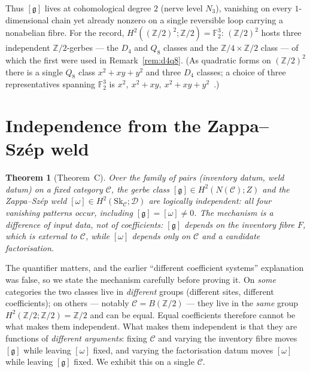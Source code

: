 \documentclass[11pt]{article}
\newtheorem{theorem}{Theorem}
\theoremstyle{definition}
\newcommand{\C}{\mathcal{C}}
\newcommand{\Sk}{\mathrm{Sk}}
\newcommand{\Z}{\mathbb{Z}}
\newcommand{\Zc}{Z}
\newcommand{\gerbe}{\mathfrak{g}}
\newcommand{\Dfr}{\mathcal{D}}
\begin{document}
Thus $[\gerbe]$ lives at cohomological degree $2$ (nerve level $N_3$), vanishing on every
$1$-dimensional chain yet already nonzero on a single reversible loop carrying a nonabelian fibre.
For the record, $H^2((\Z/2)^2;\Z/2)=\mathbb F_2^3$: $(\Z/2)^2$ hosts three independent
$\Z/2$-gerbes --- the $D_4$ and $Q_8$ classes and the $\Z/4\times\Z/2$ class --- of which the first
were used in Remark~\ref{rem:d4q8}. (As quadratic forms on $(\Z/2)^2$ there is a single $Q_8$ class
$x^2+xy+y^2$ and three $D_4$ classes; a choice of three representatives spanning $\mathbb F_2^3$ is
$x^2,\ x^2+xy,\ x^2+xy+y^2$~\cite{leanwit}.)

\section{Independence from the Zappa--Sz\'ep weld}\label{sec:C}

\begin{theorem}[Theorem~C]\label{thm:C}
Over the family of pairs (inventory datum, weld datum) on a fixed category $\C$, the gerbe class
$[\gerbe]\in H^2(N(\C);\Zc)$ and the Zappa--Sz\'ep weld $[\omega]\in H^2(\Sk_\C;\Dfr)$ are logically
independent: all four vanishing patterns occur, including $[\gerbe]=[\omega]\neq0$. The mechanism is
a difference of \emph{input data}, not of coefficients: $[\gerbe]$ depends on the inventory fibre
$F$, which is external to $\C$, while $[\omega]$ depends only on $\C$ and a candidate factorisation.
\end{theorem}

The quantifier matters, and the earlier ``different coefficient systems'' explanation was false, so
we state the mechanism carefully before proving it. On \emph{some} categories the two classes live
in \emph{different} groups (different sites, different coefficients); on others --- notably
$\C=B(\Z/2)$ --- they live in the \emph{same} group $H^2(\Z/2;\Z/2)=\Z/2$ and can be equal. Equal
coefficients therefore cannot be what makes them independent. What makes them independent is that
they are functions of \emph{different arguments}: fixing $\C$ and varying the inventory fibre moves
$[\gerbe]$ while leaving $[\omega]$ fixed, and varying the factorisation datum moves $[\omega]$ while
leaving $[\gerbe]$ fixed. We exhibit this on a single $\C$.
\end{document}
